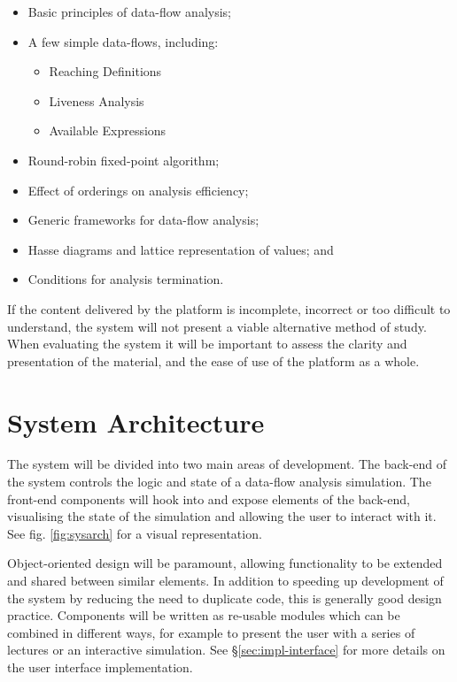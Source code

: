 \documentclass[bsc,twoside,singlespacing,parskip,logo,notimes,normalheadings]{infthesis}
\begin{document}
        \begin{itemize}
        \item Basic principles of data-flow analysis;
        \item A few simple data-flows, including:
          \begin{itemize}
          \item Reaching Definitions
          \item Liveness Analysis
          \item Available Expressions
          \end{itemize}
        \item Round-robin fixed-point algorithm;
        \item Effect of orderings on analysis efficiency;
        \item Generic frameworks for data-flow analysis;
        \item Hasse diagrams and lattice representation of values; and
        \item Conditions for analysis termination.
        \end{itemize}        

        If the content delivered by the platform is incomplete,
        incorrect or too difficult to understand, the system will not
        present a viable alternative method of study. When evaluating
        the system it will be important to assess the clarity and
        presentation of the material, and the ease of use of the
        platform as a whole.


    \section{System Architecture}
    The system will be divided into two main areas of development. The
    back-end of the system controls the logic and state of a data-flow
    analysis simulation. The front-end components will hook into and
    expose elements of the back-end, visualising the state of the
    simulation and allowing the user to interact with it. See
    fig. \ref{fig:sysarch} for a visual representation.
    
    Object-oriented design will be paramount, allowing functionality
    to be extended and shared between similar elements. In addition to
    speeding up development of the system by reducing the need to
    duplicate code, this is generally good design practice. Components
    will be written as re-usable modules which can be combined in
    different ways, for example to present the user with a series of
    lectures or an interactive simulation. See
    \S\ref{sec:impl-interface} for more details on the user
    interface implementation.
\end{document}
